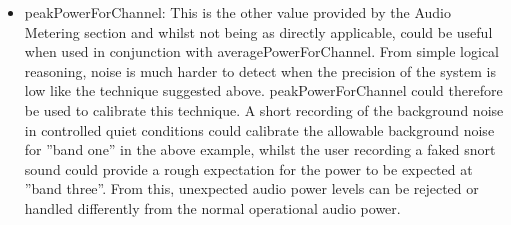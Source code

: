 \begin{itemize}
\item peakPowerForChannel: This is the other value provided by the Audio Metering section and whilst not being as directly applicable, could be useful when used in conjunction with averagePowerForChannel. From simple logical reasoning, noise is much harder to detect when the precision of the system is low like the technique suggested above. peakPowerForChannel could therefore be used to calibrate this technique. A short recording of the background noise in controlled quiet conditions could calibrate the allowable background noise for ''band one'' in the above example, whilst the user recording a faked snort sound could provide a rough expectation for the power to be expected at ''band three''. From this, unexpected audio power levels can be rejected or handled differently from the normal operational audio power.
\end{itemize}